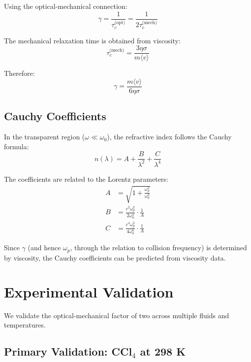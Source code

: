 \documentclass[twocolumn,10pt]{article}
\theoremstyle{definition}
\theoremstyle{remark}
\begin{document}
Using the optical-mechanical connection:
\begin{equation}
\gamma = \frac{1}{\tau_c^{\text{(opt)}}} = \frac{1}{2\tau_c^{\text{(mech)}}}
\end{equation}

The mechanical relaxation time is obtained from viscosity:
\begin{equation}
\tau_c^{\text{(mech)}} = \frac{3\eta\sigma}{m\langle v\rangle}
\end{equation}

Therefore:
\begin{equation}
\gamma = \frac{m\langle v\rangle}{6\eta\sigma}
\label{eq:gamma_from_viscosity}
\end{equation}

\subsection{Cauchy Coefficients}

In the transparent region ($\omega \ll \omega_0$), the refractive index follows the Cauchy formula:
\begin{equation}
n(\lambda) = A + \frac{B}{\lambda^2} + \frac{C}{\lambda^4}
\end{equation}

The coefficients are related to the Lorentz parameters:
\begin{align}
A &= \sqrt{1 + \frac{\omega_p^2}{\omega_0^2}} \\
B &= \frac{c^2 \omega_p^2}{2\omega_0^4} \cdot \frac{1}{A} \\
C &= \frac{c^4 \omega_p^2}{4\omega_0^6} \cdot \frac{1}{A}
\end{align}

Since $\gamma$ (and hence $\omega_p$, through the relation to collision frequency) is determined by viscosity, the Cauchy coefficients can be predicted from viscosity data.

\section{Experimental Validation}
\label{sec:validation}

We validate the optical-mechanical factor of two across multiple fluids and temperatures.

\subsection{Primary Validation: CCl$_4$ at 298 K}
\end{document}
